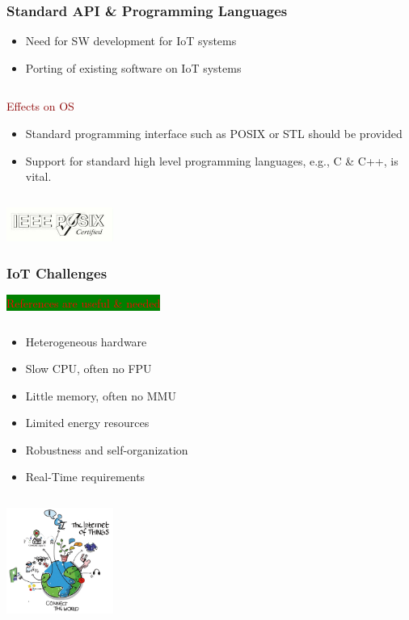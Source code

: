 \documentclass{beamer}
\begin{document}
\begin{frame}
	\frametitle{Standard API \& Programming Languages}

	\begin{itemize}
		\justifying
		\item Need for SW development for IoT systems
		\item Porting of existing software on IoT systems
	\end{itemize}

	\begin{columns}
	\begin{block}{\centering\textcolor{darkred}{Effects on OS}}
		\justifying
		\begin{itemize}
			\item Standard programming interface such as POSIX or STL should be provided
			\item Support for standard high level programming languages, e.g., C \& C++, is vital.			
		\end{itemize}
	\end{block}
	\end{columns}
	\vspace{0.5cm}

	\hspace*{7cm} \includegraphics[width=3.5cm]{figs/ieee-posix-certified.jpg}
\end{frame}

\iffalse
\begin{frame}
	\frametitle{IoT Challenges}
	\colorbox{green}{\textcolor{red}{References are useful \& needed}}	
	\begin{columns}[c]
		\begin{column}{30cm}
			\vspace{.1cm}
			\begin{itemize}
				\justifying
				\item Heterogeneous hardware
				\item Slow CPU, often no FPU
				\item Little memory, often no MMU
				\item Limited energy resources
				\item Robustness and self-organization
				\item Real-Time requirements
			\end{itemize}
		\end{column}
	\end{columns}
	\hspace*{7cm} \includegraphics[width=3.5cm]{figs/Internet-of-Things-3.jpg}
\end{frame}
\end{document}
